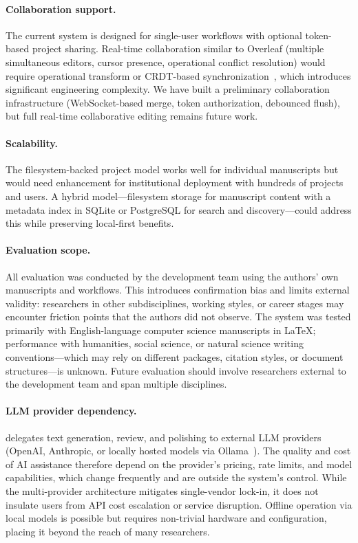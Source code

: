 \paragraph{Collaboration support.} The current system is designed for
single-user workflows with optional token-based project sharing. Real-time
collaboration similar to Overleaf (multiple simultaneous editors, cursor
presence, operational conflict resolution) would require operational transform
or CRDT-based synchronization~\cite{crdt2011}, which introduces significant engineering
complexity. We have built a preliminary collaboration infrastructure
(WebSocket-based merge, token authorization, debounced flush), but full
real-time collaborative editing remains future work.

\paragraph{Scalability.} The filesystem-backed project model works well for
individual manuscripts but would need enhancement for institutional deployment
with hundreds of projects and users. A hybrid model---filesystem storage for
manuscript content with a metadata index in SQLite or PostgreSQL for search
and discovery---could address this while preserving local-first benefits.


\paragraph{Evaluation scope.} All evaluation was conducted by the development
team using the authors' own manuscripts and workflows. This introduces
confirmation bias and limits external validity: researchers in other
subdisciplines, working styles, or career stages may encounter friction points
that the authors did not observe. The system was tested primarily with
English-language computer science manuscripts in \LaTeX{}; performance with
humanities, social science, or natural science writing conventions---which may
rely on different packages, citation styles, or document structures---is
unknown. Future evaluation should involve researchers external to the
development team and span multiple disciplines.

\paragraph{LLM provider dependency.} \software{} delegates text generation,
review, and polishing to external LLM providers (OpenAI, Anthropic, or
locally hosted models via Ollama~\cite{ollama}). The quality and cost of AI
assistance therefore depend on the provider's pricing, rate limits, and model
capabilities, which change frequently and are outside the system's control.
While the multi-provider architecture mitigates single-vendor lock-in, it does
not insulate users from API cost escalation or service disruption. Offline
operation via local models is possible but requires non-trivial hardware and
configuration, placing it beyond the reach of many researchers.

